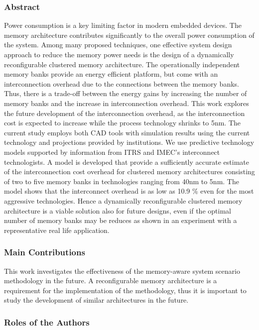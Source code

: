 \subsubsection{Abstract}
Power consumption is a key limiting factor in modern embedded devices.
The memory architecture contributes significantly to the overall power consumption of the system.
Among many proposed techniques, one effective system design approach to reduce the memory power needs is the design of a dynamically reconfigurable clustered memory architecture.
The operationally independent memory banks provide an energy efficient platform, but come with an interconnection overhead due to the connections between the memory banks. 
Thus, there is a trade-off between the energy gains by increasing the number of memory banks and the increase in interconnection overhead.
This work explores the future development of the interconnection overhead, as the interconnection cost is expected to increase while the process technology shrinks to 5nm.
The current study employs both CAD  tools with simulation results using the current technology and projections provided by institutions.
We use predictive technology models supported by information from ITRS and IMEC's interconnect technologists.
A model is developed that provide a sufficiently accurate estimate of the interconnection cost overhead for clustered memory architectures consisting of two to five memory banks in technologies ranging from 40nm to 5nm.  
The model shows that the interconnect overhead is as low as 10.9 \% even for the most aggressive technologies. Hence a dynamically reconfigurable clustered memory architecture is a viable solution also for future designs, even if the optimal number of memory banks may be reduces as shown in an experiment with a representative real life application.

\subsubsection{Main Contributions}

This work investigates the effectiveness of the memory-aware system scenario methodology in the future.
A reconfigurable memory architecture is a requirement for the implementation of the methodology, thus it is important to study the development of similar architectures in the future. 

\subsubsection{Roles of the Authors}

